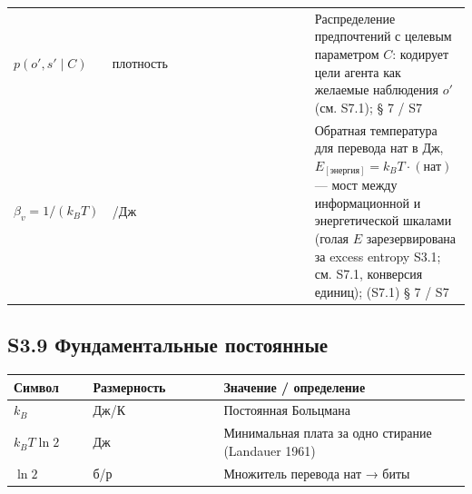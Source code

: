 \documentclass[pdflatex,sn-mathphys-ay]{sn-jnl}
\begin{document}
\begin{center}
\begin{tabular}{@{} >{\raggedright\arraybackslash}p{0.2105\linewidth} >{\raggedright\arraybackslash}p{0.4474\linewidth} >{\raggedright\arraybackslash}p{0.3421\linewidth}@{}}
\(p(o', s' \mid C)\) & плотность & Распределение предпочтений с целевым параметром \(C\): кодирует цели агента как желаемые наблюдения \(o'\) (см. S7.1); § 7 / S7 \\

\(\beta_v = 1/(k_B T)\) & 1/Дж & Обратная температура для перевода нат в Дж, \(E_{[\text{энергия}]} = k_B T \cdot (\text{нат})\) --- мост между информационной и энергетической шкалами (голая \(E\) зарезервирована за excess entropy S3.1; см. S7.1, конверсия единиц); (S7.1) § 7 / S7 \\

\bottomrule
\end{tabular}
\end{center}


\subsection*{S3.9 Фундаментальные постоянные}\label{s3.9-ux444ux443ux43dux434ux430ux43cux435ux43dux442ux430ux43bux44cux43dux44bux435-ux43fux43eux441ux442ux43eux44fux43dux43dux44bux435}



\begin{center}\small
\begin{tabular}{@{} >{\raggedright\arraybackslash}p{0.1778\linewidth} >{\raggedright\arraybackslash}p{0.2889\linewidth} >{\raggedright\arraybackslash}p{0.5333\linewidth}@{}}
\toprule

\begin{minipage}[b]{\linewidth}\raggedright

Символ

\end{minipage} & \begin{minipage}[b]{\linewidth}\raggedright

Размерность

\end{minipage} & \begin{minipage}[b]{\linewidth}\raggedright

Значение / определение

\end{minipage} \\

\midrule

\(k_B\) & Дж/К & Постоянная Больцмана \\

\(k_B T \ln 2\) & Дж & Минимальная плата за одно стирание (Landauer 1961) \\

\(\ln 2\) & б/р & Множитель перевода нат → биты \\

\bottomrule
\end{tabular}
\end{center}
\end{document}
